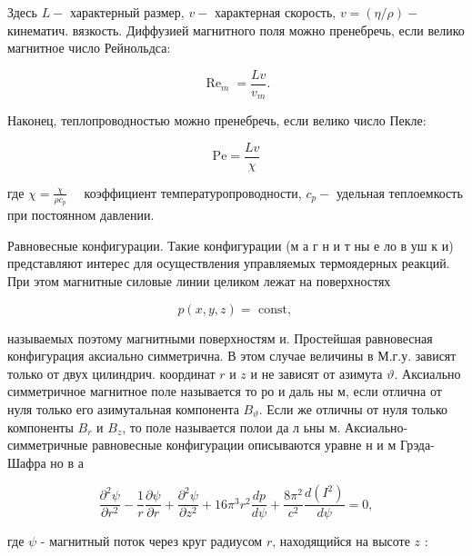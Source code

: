 \documentclass[10pt]{article}
\begin{document}
Здесь $L-$ характерный размер, $v-$ характерная скорость, $v=(\eta / \rho)-$ кинематич. вязкость. Диффузией магнитного поля можно пренебречь, если велико магнитное число Рейнольдса:



\[

\operatorname{Re}_{m}=\frac{L v}{v_{m}} .

\]



Наконец, теплопроводностью можно пренебречь, если велико число Пекле:



\[

\mathrm{Pe}=\frac{L v}{\chi}

\]



где $\chi=\frac{\chi}{\rho c_{p}} \quad$ коэффициент температуропроводности, $c_{p}-$ удельная теплоемкость при постоянном давлении.



Равновесные конфигурации. Такие конфигурации (м а г н и т ны е ло в уш к и) представляют интерес для осуществления управляемых термоядерных реакций. При этом магнитные силовые линии целиком лежат на поверхностях



\[

p(x, y, z)=\text { const, }

\]



называемых поэтому магнитными поверхностям и. Простейшая равновесная конфигурация аксиально симметрична. В этом случае величины в М.г.у. зависят только от двух цилиндрич. координат $r$ и $z$ и не зависят от азимута $\vartheta$. Аксиально симметричное магнитное поле называется то ро и даль ны м, если отлична от нуля только его азимутальная компонента $B_{\vartheta}$. Если же отличны от нуля только компоненты $B_{r}$ и $B_{z}$, то поле называется полои да л ьны м. Аксиально-симметричные равновесные конфигурации описываются уравне н и м Грэда-Шафра но в а



\[

\frac{\partial^{2} \psi}{\partial r^{2}}-\frac{1}{r} \frac{\partial \psi}{\partial r}+\frac{\partial^{2} \psi}{\partial z^{2}}+16 \pi^{3} r^{2} \frac{d p}{d \psi}+\frac{8 \pi^{2}}{c^{2}} \frac{d\left(I^{2}\right)}{d \psi}=0,

\]



где $\psi$ - магнитный поток через круг радиусом $r$, находящийся на высоте $z$ :
\end{document}
